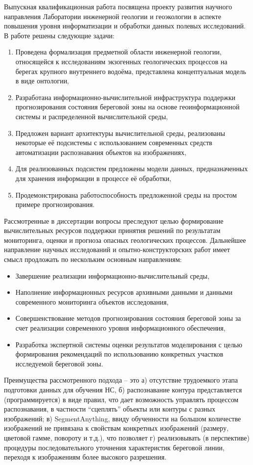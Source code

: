 \documentclass[732,fontsize=14pt,final]{studrep}
\begin{document}
Выпускная квалификационная работа посвящена проекту развития научного направления Лаборатории инженерной геологии и геоэкологии в аспекте повышения уровня информатизации и обработки данных полевых исследований. В работе решены следующие задачи:
\begin{enumerate}
  \item Проведена формализация предметной области инженерной геологии, относящейся к исследованиям экзогенных геологических процессов на берегах крупного внутреннего водоёма, представлена концептуальная модель в виде онтологии,
  \item Разработана информационно-вычислительной инфраструктура поддержки прогнозирования состояния береговой зоны на основе геоинформационной системы и распределенной вычислительной среды,
  \item Предложен вариант архитектуры вычислительной среды,  реализованы некоторые её подсистемы с использованием современных средств автоматизации распознавания объектов на изображениях,
  \item Для реализованных подсистем предложены модели данных, предназначенных для хранения информации в процессе её обработки,
  \item Продемонстрирована работоспособность предложенной среды на простом примере прогнозирования.
\end{enumerate}

Рассмотренные в диссертации вопросы преследуют целью формирование вычислительных ресурсов поддержки принятия решений по результатам мониторинга, оценки и прогноза опасных геологических процессов. Дальнейшее направление научных исследований и опытно-конструкторских работ имеет смысл продложать по нескольким основным направлениям:
\begin{itemize}
  \item Завершение реализации информационно-вычислительный среды,
  \item Наполнение информационных ресурсов архивными данными и данными современного мониторинга объектов исследования,
  \item Совершенствование методов прогнозирования состояния береговой зоны за счет реализации современного уровня информационного обеспечения,
  \item Разработка экспертной системы оценки результатов моделирования с целью формирования рекомендаций по использованию конкретных участков исследуемой береговой зоны.
\end{itemize}

Преимущества рассмотренного подхода -- это а) отсутствие трудоемкого этапа подготовки данных для обучения НС, б) распознавание контура представляется (программируется) в виде правил, что дает возможность управлять процессом распознавания, в частности “сцеплять” объекты или контуры с разных изображений; в) SegmentAnything, ввиду обученности на большом количестве изображений не привязана к свойствам конкретных изображений (размеру, цветовой гамме, повороту и т.д.), что позволяет г) реализовывать (в перспективе) процедуры последовательного уточнения характеристик береговой линии, переходя к изображениям более высокого разрешения.
\end{document}
